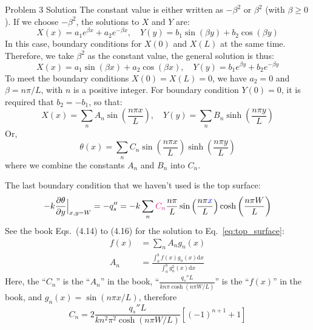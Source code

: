 \documentclass[9pt, aspectratio=169, handout]{beamer}
\begin{document}
\begin{frame}[allowframebreaks]{Problem 3 Solution}
    The constant value is either written as $-\beta^2$ or $\beta^2$ (with $\beta\geq 0$). If we choose $-\beta^2$, the solutions to $X$ and $Y$ are:
    \begin{equation*}
        X(x) = a_1 e^{\beta x} + a_2 e^{-\beta x}, \quad Y(y) = b_1 \sin(\beta y) + b_2 \cos(\beta y)
    \end{equation*}
    In this case, boundary conditions for $X(0)$ and $X(L)$  at the same time.
    Therefore, we take $\beta^2$ as the constant value, the general solution is thus:
    \begin{equation*}
        X(x) = a_1\sin(\beta x) + a_2\cos(\beta x), \quad Y(y) = b_1 e^{\beta y} + b_2 e^{-\beta y}
    \end{equation*}
    To meet the boundary conditions $X(0) = X(L) = 0$, we have $a_2 = 0$ and $\beta = n\pi/L$, with $n$ is a positive integer.
    For boundary condition $Y(0) = 0$, it is required that $b_2 = -b_1$, so that:
    \begin{equation*}
        X(x) = \sum_{n} A_n \sin\left(\frac{n\pi x}{L}\right), \quad Y(y) = \sum_n B_n \sinh\left(\frac{n\pi y}{L}\right)
    \end{equation*}
    Or,
    \begin{equation*}
        \theta(x) = \sum_n C_n \sin\left(\frac{n\pi x}{L}\right) \sinh\left(\frac{n\pi y}{L}\right)
    \end{equation*}
    where we combine the constants $A_n$ and $B_n$ into $C_n$.

    \framebreak

    The last boundary condition that we haven't used is the top surface:
    \begin{equation*}
        -k\frac{\partial \theta}{\partial y}\Big|_{x, y=W} = -q_s'' = -k\sum_n \myhl{C_n} \frac{n\pi}{L} \sin\left(\frac{n\pi \myhlb{x}}{L}\right) \cosh\left(\frac{n\pi W}{L}\right)
        \label{eq:top_surface}
    \end{equation*}
    See the book Eqs.~(4.14) to (4.16) for the solution to Eq.~\eqref{eq:top_surface}:
    \begin{subequations}
        \begin{align}
            f(x) &= \sum_n A_n g_n (x) \tag{4.14 in the book} \\
            A_n &= \frac{\int_a^b f(x)g_n(x)\mathrm{d}x}{\int_a^b g_n^2(x)\mathrm{d}x} \tag{4.16 in the book}
        \end{align}
    \end{subequations}
    Here, the ``$C_n$'' is the ``$A_n$'' in the book, ``$\frac{q_s''L}{kn\pi\cosh(n\pi W/L)}$'' is the ``$f(x)$'' in the book, and $g_n (x) = \sin(n\pi x/L)$, therefore
    \begin{equation*}
        C_n = 2\frac{q_s''L}{kn^2 \pi^2 \cosh(n\pi W/L)} \left[(-1)^{n+1} + 1 \right]
    \end{equation*}
\end{frame}
\end{document}
